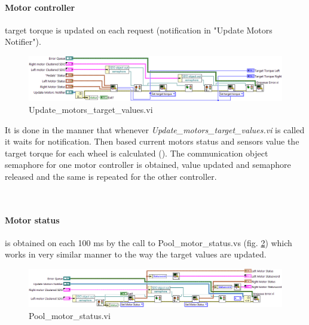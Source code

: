 \paragraph{Motor controller} target torque is updated on each request (notification in "Update Motors Notifier"). 
\begin{figure}[H]
    \centering
    \includegraphics[width=\textwidth]{figures/Update_motors_target_valuesd}
    \caption{Update\_motors\_target\_values.vi}
    \label{vi:Update_motors_target_values}
\end{figure}
It is done in the manner that whenever \textit{Update\_motors\_target\_values.vi} is called it waits for notification. Then based current motors status and sensors value the target torque for each wheel is calculated (). The communication object semaphore for one motor controller is obtained, value updated and semaphore released and the same is repeated for the other controller.

\\

\paragraph{Motor status} is obtained on each 100 ms by the call to Pool\_motor\_status.vs (fig. \ref{vi:Pool_motor_statusd}) which works in very similar manner to the way the target values are updated.
\begin{figure}[H]
    \centering
    \includegraphics[width=\textwidth]{figures/Pool_motor_statusd}
    \caption{Pool\_motor\_status.vi}
    \label{vi:Pool_motor_statusd}
\end{figure}

